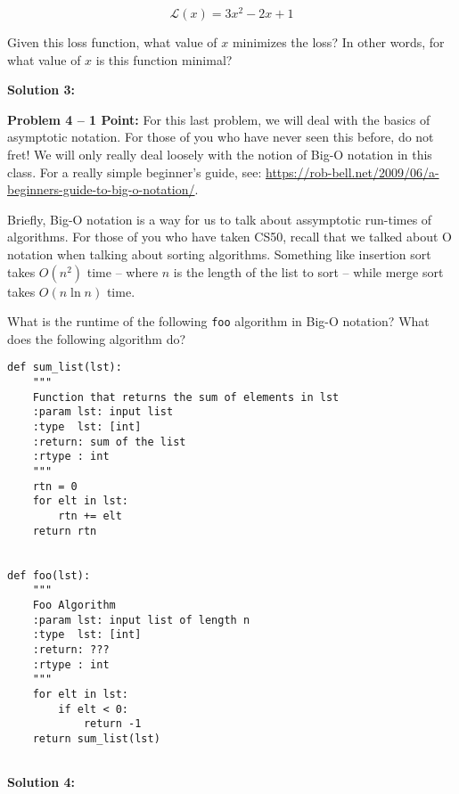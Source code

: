 \documentclass[]{article}
\begin{document}
$$\mathcal{L}(x) = 3x^2 - 2x + 1$$

Given this loss function, what value of $x$ minimizes the loss?  In other words, for what value of $x$ is this function minimal?

\textbf{Solution 3:}

\clearpage

\textbf{Problem 4 -- 1 Point:}
For this last problem, we will deal with the basics of asymptotic notation.  For those of you who have never seen this before, do not fret!  We will only really deal loosely with the notion of Big-O notation in this class.  For a really simple beginner's guide, see: \url{https://rob-bell.net/2009/06/a-beginners-guide-to-big-o-notation/}.

Briefly, Big-O notation is a way for us to talk about assymptotic run-times of algorithms.  For those of you who have taken CS50, recall that we talked about O notation when talking about sorting algorithms.  Something like insertion sort takes $O(n^2)$ time -- where $n$ is the length of the list to sort -- while merge sort takes $O(n\ln n)$ time.

What is the runtime of the following \texttt{foo} algorithm in Big-O notation?  What does the following algorithm do?

\begin{lstlisting}
def sum_list(lst):
    """
    Function that returns the sum of elements in lst
    :param lst: input list
    :type  lst: [int]
    :return: sum of the list
    :rtype : int
    """
    rtn = 0
    for elt in lst:
        rtn += elt
    return rtn


def foo(lst):
    """
    Foo Algorithm
    :param lst: input list of length n
    :type  lst: [int]
    :return: ???
    :rtype : int
    """
    for elt in lst:
        if elt < 0:
            return -1
    return sum_list(lst)
        

\end{lstlisting}

\textbf{Solution 4:}
\end{document}
